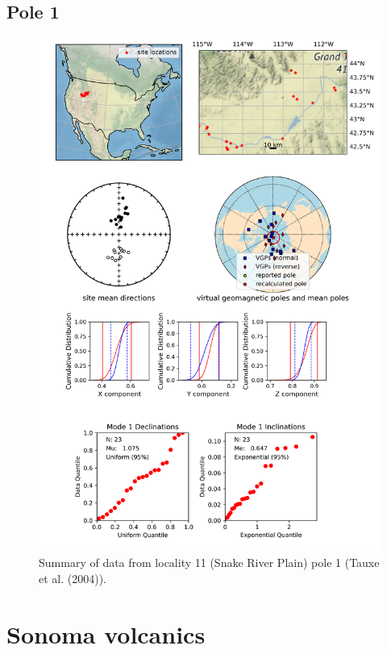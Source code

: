 \documentclass{article}
\begin{document}
\subsection{Pole 1}


\begin{figure}[H]
\centering
\includegraphics[width=5 in]{./11/1/pole_summary.png}
\caption{Summary of data from locality 11 (Snake River Plain) pole 1 (Tauxe et al. (2004)).}
\end{figure}

\section{Sonoma volcanics}
\end{document}
